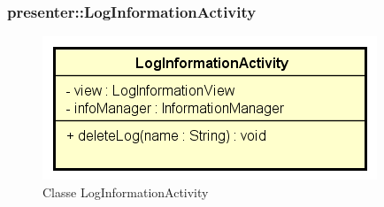 \documentclass[../DefinizioneDiProdotto.tex]{subfiles}
\begin{document}
\subsubsection{presenter::LogInformationActivity}

    \begin{figure}[H]
        \centering
        \includegraphics{img/LogInformationActivity.png}
        \caption{Classe LogInformationActivity}\label{fig:presenter::LogInformationActivity} 
    \end{figure}
\end{document}
